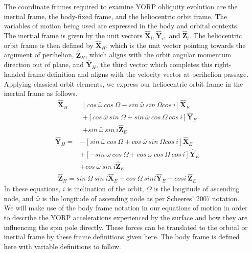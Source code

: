 The coordinate frames required to examine YORP obliquity evolution are the inertial frame, the body-fixed frame, and the heliocentric orbit frame. The variables of motion being used are expressed in the body and orbital contexts. The inertial frame is given by the unit vectors $\mathbf{\hat{X}}_i, \mathbf{\hat{Y}}_i,$ and $\mathbf{\hat{Z}}_i$. The heliocentric orbit frame is then defined by $\mathbf{\hat{X}}_H$, which is the unit vector pointing towards the argument of perihelion, $\mathbf{\hat{Z}}_H$, which aligns with the orbit angular momentum direction out of plane, and $\mathbf{\hat{Y}}_H$, the third vector which completes this right-handed frame definition and aligns with the velocity vector at perihelion passage.
Applying classical orbit elements, we express our heliocentric orbit frame in the inertial frame as follows.
\begin{equation}
\begin{split}
\mathbf{\hat{X}}_H = &[cos \: \bar{\omega} \:cos\:\Omega - sin \:\bar{\omega}\:sin\:\Omega cos \:i] \mathbf{\hat{X}}_E \\
& + [cos\:\bar{\omega}\:sin\:\Omega + sin\:\bar{\omega}\:cos\:\Omega \:cos\: i] \mathbf{\hat{Y}}_E \\
& + sin\: \bar{\omega} \:sin \:i \mathbf{\hat{Z}}_E
\end{split}
\end{equation}
\begin{equation}
\begin{split}
\mathbf{\hat{Y}}_H = &-[sin \: \bar{\omega} \:cos\:\Omega + cos \:\bar{\omega}\:sin\:\Omega cos \:i] \mathbf{\hat{X}}_E \\
& + [-sin\:\bar{\omega}\:cos\:\Omega + cos\:\bar{\omega}\:cos\:\Omega \:cos\: i] \mathbf{\hat{Y}}_E \\
& + cos\: \bar{\omega} \:sin \:i \mathbf{\hat{Z}}_E
\end{split}
\end{equation}
\begin{equation}
\begin{split}
\mathbf{\hat{Z}}_H = sin \: \Omega \: sin\: i \mathbf{\hat{X}}_E - cos \: \Omega\: sin i \mathbf{\hat{Y}}_E + cos i \:\mathbf{\hat{Z}}_E
\end{split}
\end{equation}
In these equations, $i$ is inclination of the orbit, $\Omega$ is the longitude of ascending node, and $\bar{\omega}$ is the longitude of ascending node as per Scheeres' 2007 notation. We will make use of the body frame notation in our equations of motion in order to describe the YORP accelerations experienced by the surface and how they are influencing the spin pole directly. These forces can be translated to the orbital or inertial frame by these frame definitions given here. The body frame is defined here with variable definitions to follow.

